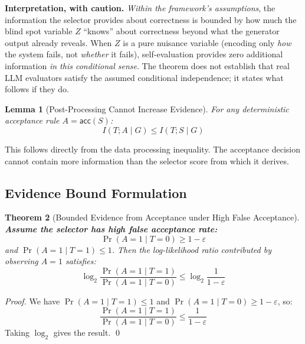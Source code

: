 \documentclass[11pt]{article}
\newtheorem{theorem}{Theorem}[section]
\newtheorem{lemma}[theorem]{Lemma}
\begin{document}
\textbf{Interpretation, with caution.} \emph{Within the framework's assumptions}, the information the selector provides about correctness is bounded by how much the blind spot variable $Z$ ``knows'' about correctness beyond what the generator output already reveals. When $Z$ is a pure nuisance variable (encoding only \textit{how} the system fails, not \textit{whether} it fails), self-evaluation provides zero additional information \emph{in this conditional sense}. The theorem does not establish that real LLM evaluators satisfy the assumed conditional independence; it states what follows if they do.

\begin{lemma}[Post-Processing Cannot Increase Evidence]
\label{lem:post_processing}
For any deterministic acceptance rule $A = \mathsf{acc}(S)$:
\begin{equation}
I(T; A \mid G) \leq I(T; S \mid G)
\end{equation}
\end{lemma}

This follows directly from the data processing inequality. The acceptance decision cannot contain more information than the selector score from which it derives.

\subsection{Evidence Bound Formulation}

\begin{theorem}[Bounded Evidence from Acceptance under High False Acceptance]
\label{thm:evidence_bound}
\textbf{Assume the selector has high false acceptance rate:}
\begin{equation}
\Pr(A = 1 \mid T = 0) \geq 1 - \varepsilon
\end{equation}
and $\Pr(A = 1 \mid T = 1) \leq 1$. Then the log-likelihood ratio contributed by observing $A = 1$ satisfies:
\begin{equation}
\log_2 \frac{\Pr(A = 1 \mid T = 1)}{\Pr(A = 1 \mid T = 0)} \leq \log_2 \frac{1}{1 - \varepsilon}
\end{equation}
\end{theorem}

\begin{proof}
We have $\Pr(A = 1 \mid T = 1) \leq 1$ and $\Pr(A = 1 \mid T = 0) \geq 1 - \varepsilon$, so:
\begin{equation}
\frac{\Pr(A = 1 \mid T = 1)}{\Pr(A = 1 \mid T = 0)} \leq \frac{1}{1 - \varepsilon}
\end{equation}
Taking $\log_2$ gives the result. \qed
\end{proof}
\end{document}
